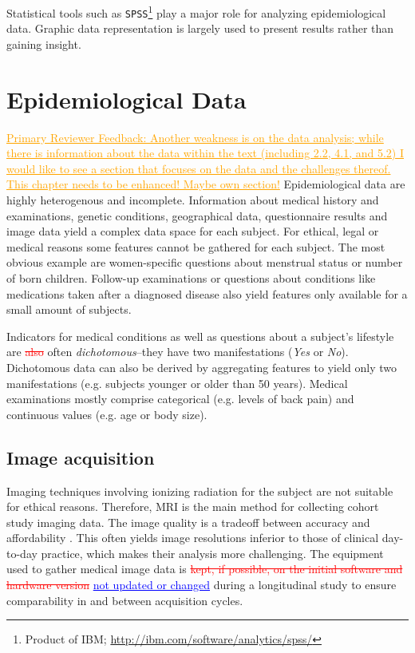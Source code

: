 \documentclass[journal]{style/vgtc} 			          %
\newcommand{\rem}[1]{\textcolor{red}{\sout{#1}}}
\newcommand{\add}[1]{\textcolor{blue}{\uline{#1}}}
\newcommand{\com}[1]{\textcolor{orange}{\uline{#1}}}
\begin{document}
Statistical tools such as \texttt{SPSS}\footnote{Product of IBM; \url{http://ibm.com/software/analytics/spss/}} play a major role for analyzing epidemiological data.
%
Graphic data representation is largely used to present results rather than gaining insight.
	
\section{Epidemiological Data} \label{EpidemiologicalData}
\com{Primary Reviewer Feedback: Another weakness is on the data analysis; while there is information about the data within the text (including 2.2, 4.1, and 5.2) I would like to see a section that focuses on the data and the challenges thereof.
This chapter needs to be enhanced! Maybe own section!}
Epidemiological data are highly heterogenous and incomplete.
%
Information about medical history and examinations, genetic conditions, geographical data, questionnaire results and image data yield a complex data space for each subject.
%
For ethical, legal or medical reasons some features cannot be gathered for each subject.
%
The most obvious example are women-specific questions about menstrual status or number of born children.
%
Follow-up examinations or questions about conditions like medications taken after a diagnosed disease also yield features only available for a small amount of subjects.
%

Indicators for medical conditions as well as questions about a subject's lifestyle are \rem{also} often \emph{dichotomous}--they have two manifestations (\emph{Yes} or \emph{No}).
%
Dichotomous data can also be derived by aggregating features to yield only two manifestations (e.g. subjects younger or older than 50 years).
%
Medical examinations mostly comprise categorical (e.g. levels of back pain) and continuous values (e.g. age or body size).

\subsection{Image acquisition} \label{ImageAcquisition} Imaging techniques involving ionizing radiation for the subject are not suitable for ethical reasons.
%
Therefore, MRI is the main method for collecting cohort study imaging data.
%
The image quality is a tradeoff between accuracy and affordability \cite{Preim2014}.
%
This often yields image resolutions inferior to those of clinical day-to-day practice, which makes their analysis more challenging.
%
The equipment used to gather medical image data is \rem{kept, if possible, on the initial software and hardware version} \add{not updated or changed} during a longitudinal study to ensure comparability in and between acquisition cycles.
\end{document}
